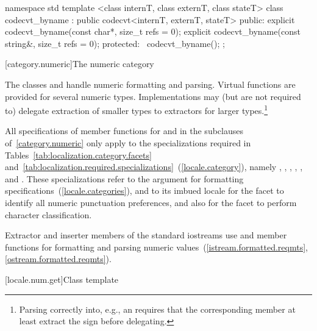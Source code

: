 %
\begin{codeblock}
namespace std {
  template <class internT, class externT, class stateT>
  class codecvt_byname : public codecvt<internT, externT, stateT> {
  public:
    explicit codecvt_byname(const char*, size_t refs = 0);
    explicit codecvt_byname(const string&, size_t refs = 0);
  protected:
    ~codecvt_byname();
  };
}
\end{codeblock}

[category.numeric]{The numeric category}

\pnum
The classes
and
handle numeric formatting and parsing.
Virtual functions are provided for several numeric types.
Implementations may (but are not required to) delegate extraction
of smaller types to extractors for larger types.\footnote{Parsing
 correctly into, e.g., an
requires that the corresponding member
at least extract the sign before delegating.}

\pnum
All specifications of member functions for
and
in the subclauses of~\ref{category.numeric} only apply to the
specializations required in Tables~\ref{tab:localization.category.facets}
and~\ref{tab:localization.required.specializations}~(\ref{locale.category}), namely
,
,
,
,
,
and
.
These specializations refer to the
argument for formatting specifications~(\ref{locale.categories}),
and to its imbued locale for the
facet to identify all numeric punctuation preferences,
and also for the
facet to perform character classification.

\pnum
Extractor and inserter members of the standard iostreams use
and
member functions for formatting and parsing numeric values~(\ref{istream.formatted.reqmts}, \ref{ostream.formatted.reqmts}).

[locale.num.get]{Class template }

